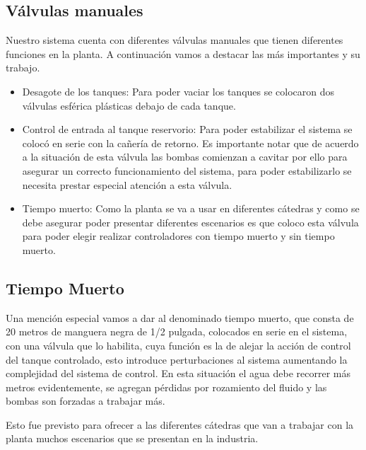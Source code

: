 \subsection{Válvulas manuales}

Nuestro sistema cuenta con diferentes válvulas manuales que tienen diferentes funciones en la planta.
A continuación vamos a destacar las más importantes y su trabajo.

\begin{itemize}
  \item Desagote de los tanques:
  Para poder vaciar los tanques se colocaron dos válvulas esférica plásticas debajo de cada tanque.
  \item Control de entrada al tanque reservorio:
  Para poder estabilizar el sistema se colocó en serie con la cañería de retorno.
   Es importante notar que de acuerdo a la situación de esta válvula las bombas comienzan a cavitar 
  por ello para asegurar un correcto funcionamiento del sistema, para poder estabilizarlo se necesita
  prestar especial atención a esta válvula.
  \item Tiempo muerto: 
  Como la planta se va a usar en diferentes cátedras y como se debe asegurar poder presentar diferentes
  escenarios es que coloco esta válvula para poder elegir realizar controladores con tiempo muerto
  y sin tiempo muerto.
 \end{itemize}

\subsection{Tiempo Muerto}
Una mención especial vamos a dar al denominado tiempo muerto, que consta de 20 metros de manguera negra de 1/2 pulgada, colocados en serie en el sistema, con una válvula que lo
habilita, cuya función es la de alejar la acción de control del tanque  controlado, esto introduce 
perturbaciones al sistema aumentando la complejidad del sistema de control. En esta situación el agua
debe recorrer más metros evidentemente, se agregan pérdidas por rozamiento del fluido y las bombas 
son forzadas a trabajar más.

Esto fue previsto para ofrecer a las diferentes cátedras que van a trabajar con la planta muchos 
escenarios que se presentan en la industria.
